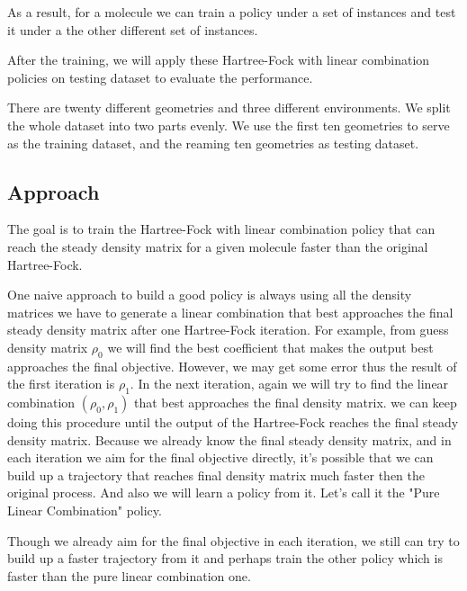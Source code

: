 \documentclass[twoside]{article}
\begin{document}
As a result, for a molecule we can train a policy under a set of instances and test it under a the other different set of instances.

After the training, we will apply these Hartree-Fock with linear combination policies on testing dataset to evaluate the performance.


There are twenty different geometries and three different environments. We split the whole dataset into two parts evenly. 
We use the first ten geometries to serve as the training dataset, and the reaming ten geometries as testing dataset.

\subsection{Approach}
The goal is to train the Hartree-Fock with linear combination policy that can reach the steady density matrix for a given molecule faster than the original Hartree-Fock.


One naive approach to build a good policy is always using all the density matrices we have to generate a linear combination that best approaches the final steady density matrix after one Hartree-Fock iteration.  For example, from guess density matrix $\rho_0$ we will find the best coefficient that makes the output best approaches the final objective. However, we may get some error thus the result of the first iteration is $\rho_1$.  In the next iteration, again we will try to find the linear combination $(\rho_0, \rho_1)$ that best approaches the final density matrix. we can keep doing this procedure until the output of the Hartree-Fock reaches the final steady density matrix.
Because we already know the final steady density matrix, and in each iteration we aim for the final objective directly, it's possible that we can build up a trajectory that reaches final density matrix much faster then the original process. And also we will learn a policy from it. Let's call it the "Pure Linear Combination" policy.

Though we already aim for the final objective in each iteration, we still can try to build up a faster trajectory from it and perhaps train the other policy which is faster than the pure linear combination one.
\end{document}
